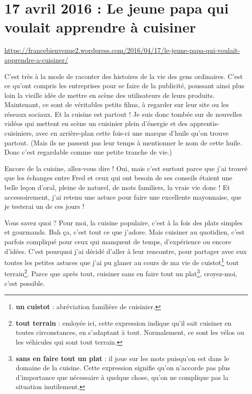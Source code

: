 \documentclass[11pt, french]{report}
\begin{document}
\vfill

\chapter{17 avril 2016 : Le jeune papa qui voulait apprendre à cuisiner}

\url{https://francebienvenue2.wordpress.com/2016/04/17/le-jeune-papa-qui-voulait-apprendre-a-cuisiner/}

\vfill

C’est très à la mode de raconter des histoires de la vie des gens ordinaires.
C’est ce qu’ont compris les entreprises pour se faire de la publicité, poussant
ainsi plus loin la vieille idée de mettre en scène des utilisateurs de leurs
produits. Maintenant, ce sont de véritables petits films, à regarder sur leur
site ou les réseaux sociaux. Et la cuisine est partout ! Je suis donc tombée sur
de nouvelles vidéos qui mettent en scène un cuisinier plein d’énergie et des
apprentis-cuisiniers, avec en arrière-plan cette fois-ci une marque d’huile
qu’on trouve partout. (Mais ils ne passent pas leur temps à mentionner le nom
de cette huile. Donc c’est regardable comme une petite tranche de vie.)

Encore de la cuisine, allez-vous dire ! Oui, mais c’est surtout parce que j’ai
trouvé que les échanges entre Fred et ceux qui ont besoin de ses conseils étaient
une belle leçon d’oral, pleine de naturel, de mots familiers, la vraie vie donc !
Et accessoirement, j’ai retenu une astuce pour faire une excellente mayonnaise,
que je testerai un de ces jours !

\vfill

Vous savez quoi ? Pour moi, la cuisine populaire, c’est à la fois des plats
simples et gourmands. Bah ça, c’est tout ce que j’adore. Mais cuisiner au
quotidien, c’est parfois compliqué pour ceux qui manquent de temps, d’expérience
ou encore d’idées. C’est pourquoi j’ai décidé d’aller à leur rencontre, pour
partager avec eux toutes les petites astuces que j’ai pu glaner au cours de ma
vie de cuistot\footnote{\textbf{un cuistot} : abréviation familière de cuisinier.}
tout terrain\footnote{\textbf{tout terrain} : emloyée ici, cette expression indique
  qu’il sait cuisiner en toutes circonstances, en s’adaptant à tout. Normalement,
  ce sont les vélos ou les véhicules qui sont tout terrain.}. Parce que après
tout, cuisiner sans en faire tout un plat\footnote{\textbf{sans en faire tout un
    plat} : il joue sur les mots puisqu’on est dans le domaine de la cuisine.
  Cette expression signifie qu’on n’accorde pas plus d’importance que nécessaire à
  quelque chose, qu’on ne complique pas la situation inutilement.}, croyez-moi,
c’est possible.
\end{document}
